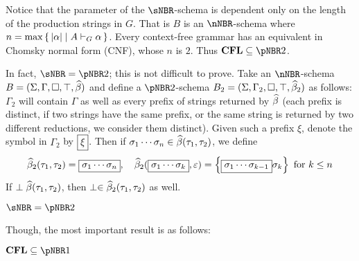 \documentclass{llncs}
\begin{document}
Notice that the parameter of the $\sNBR$-schema is dependent only on the length of the production strings in $G$.
That is $B$ is an $\nNBR$-schema where $n=\max\set{\abs\alpha}[A\vdash_G\alpha]$.
Every context-free grammar has an equivalent in Chomsky normal form (CNF), whose $n$ is $2$.
Thus $\CFL\subseteq\pNBR2$.

In fact, $\sNBR=\pNBR2$; this is not difficult to prove.
Take an $\nNBR$-schema $B=(\Sigma,\Gamma,\square,\top,\widehat\beta)$ and define a $\pNBR2$-schema
$B_2=(\Sigma,\Gamma_2,\square,\top,\widehat\beta_2)$ as follows: $\Gamma_2$ will contain $\Gamma$ as well as every prefix of strings
returned by $\widehat\beta$ (each prefix is distinct, if two strings have the same prefix, or the same string is returned by two different
reductions, we consider them distinct).
Given such a prefix $\xi$, denote the symbol in $\Gamma_2$ by $\mbox\xi$.
Then if $\sigma_1\cdots\sigma_n\in\widehat\beta(\tau_1,\tau_2)$, we define
$$ \hb_2(\tau_1,\tau_2) = \mbox{\sigma_1\cdots\sigma_n},\quad
\hb_2(\mbox{\sigma_1\cdots\sigma_k},\epsilon)=\set{\mbox{\sigma_1\cdots\sigma_{k-1}}\sigma_k}\hbox{ for $k\leq n$} $$
If $\perp\widehat\beta(\tau_1,\tau_2)$, then $\perp\in\widehat\beta_2(\tau_1,\tau_2)$ as well.

\begin{lemma}

    $\sNBR=\pNBR2$

\end{lemma}

Though, the most important result is as follows:

\begin{lemma}

    $\CFL\subseteq\pNBR1$

\end{lemma}
\end{document}
